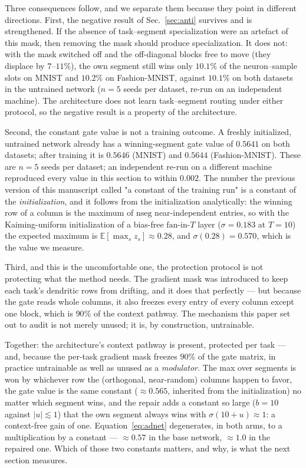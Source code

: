 \documentclass[review,12pt,number]{elsarticle}
\begin{document}
Three consequences follow, and we separate them because they point in
different directions. First, the negative result of
Sec.~\ref{sec:anti} survives and is strengthened. If the absence of
task--segment specialization were an artefact of this mask, then
removing the mask should produce specialization. It does not: with the
mask switched off and the off-diagonal blocks free to move (they
displace by $7$--$11\%$), the own segment still wins only
$10.1\%$ of the neuron--sample slots on MNIST and $10.2\%$ on
Fashion-MNIST, against $10.1\%$ on both datasets in the untrained network
($n=5$ seeds per dataset, re-run on an independent machine).
The architecture does not learn task--segment routing under either
protocol, so the negative result is a property of the architecture.

Second, the constant gate value is not a training outcome. A freshly
initialized, untrained network already has a winning-segment gate value
of $0.5641$ on both datasets; after training it is $0.5646$
(MNIST) and $0.5644$ (Fashion-MNIST). These are $n=5$ seeds per dataset;
an independent re-run on a different machine reproduced every value in this
section to within $0.002$. The number the previous version of
this manuscript called "a constant of the training run" is a constant of
the \emph{initialization}, and it follows from the initialization
analytically: the winning row of a column is the maximum of
$\text{nseg}$ near-independent entries, so with the Kaiming-uniform
initialization of a bias-free $\text{fan}$-in-$T$ layer
($\sigma = 0.183$ at $T = 10$) the expected maximum is
$\mathbb{E}[\max_{s} z_s] \approx 0.28$, and
$\sigma(0.28) = 0.570$, which is the value we measure.

Third, and this is the uncomfortable one, the protection protocol is
not protecting what the method needs. The gradient mask was introduced
to keep each task's dendritic rows from drifting, and it does that
perfectly --- but because the gate reads whole columns, it also freezes
every entry of every column except one block, which is $90\%$ of the
context pathway. The mechanism this paper set out to audit is not merely
unused; it is, by construction, untrainable.

Together: the architecture's context pathway is present, protected per
task --- and, because the per-task gradient mask freezes $90\%$ of the
gate matrix, in practice untrainable as well as unused as a
\emph{modulator}. The max over segments is won by whichever row the
(orthogonal, near-random) columns happen to favor, the gate value is the
same constant ($\approx 0.565$, inherited from the initialization) no
matter which segment wins, and the repair adds a constant so large
($b{=}10$ against $|u| \lesssim 1$) that the own segment always wins
with $\sigma(10 + u) \approx 1$: a context-free gain of one. Equation~\ref{eq:adnet} degenerates, in both arms, to a
multiplication by a constant --- ${\approx}0.57$ in the base network,
${\approx}1.0$ in the repaired one. Which of those two constants
matters, and why, is what the next section measures.
\end{document}

